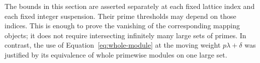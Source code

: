 The bounds in this section are asserted separately at each
fixed lattice index and each fixed integer suspension. Their
prime thresholds may depend on those indices. This is enough
to prove the vanishing of the corresponding mapping objects;
it does not require intersecting infinitely many large sets
of primes. In contrast, the use of
Equation~\eqref{eq:whole-module} at the moving weight
$p\lambda+\delta$ was justified by its equivalence of whole
primewise modules on one large set.
